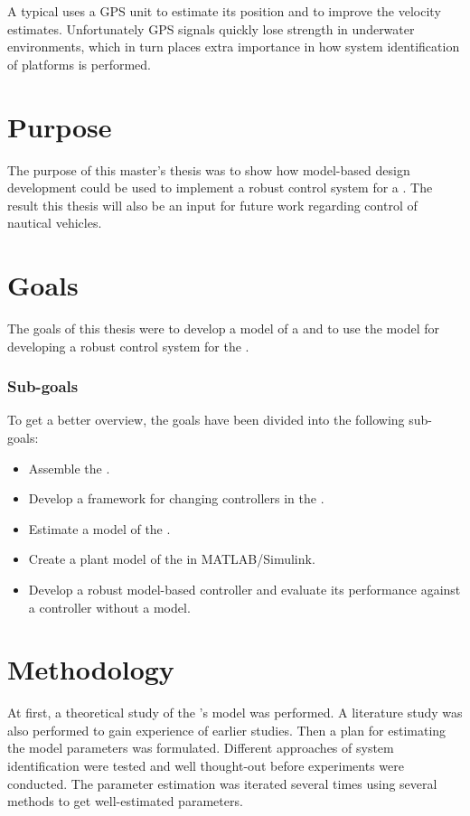 A typical \abbrUV uses a GPS unit to estimate its position and to improve the velocity estimates. Unfortunately GPS signals quickly lose strength in underwater environments, which in turn places extra importance in how system identification of \abbrROV platforms is performed.


\section{Purpose}
The purpose of this master's thesis was to show how model-based design development could be used to implement a robust control system for a \abbrROV. The result this thesis will also be an input for future work regarding control of nautical vehicles. 


\section{Goals}
The goals of this thesis were to develop a model of a \abbrROV and to use the model for developing a robust control system for the \abbrROV.

\subsubsection{Sub-goals}
To get a better overview, the goals have been divided into the following sub-goals:
\begin{itemize}
    \item Assemble the \abbrROV.
    \item Develop a framework for changing controllers in the \abbrROV.
    \item Estimate a model of the \abbrROV.
    \item Create a plant model of the \abbrROV in MATLAB/Simulink.
    \item Develop a robust model-based controller and evaluate its performance against a controller without a model.
\end{itemize}

\section{Methodology}
At first, a theoretical study of the \abbrROV's model was performed. A literature study was also performed to gain experience of earlier studies. Then a plan for estimating the model parameters was formulated. Different approaches of system identification were tested and well thought-out before experiments were conducted. The parameter estimation was iterated several times using several methods to get well-estimated parameters. 

